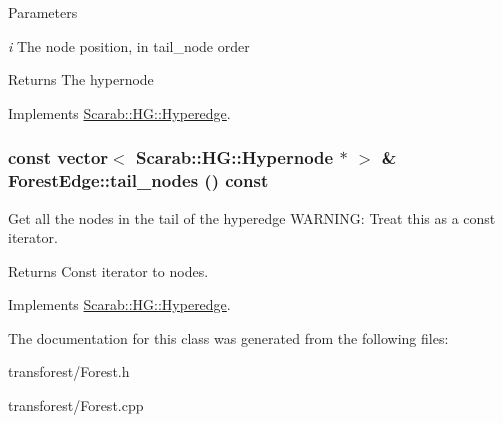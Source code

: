 \begin{DoxyParams}{Parameters}
\item[{\em i}]The node position, in tail\_\-node order\end{DoxyParams}
\begin{DoxyReturn}{Returns}
The hypernode 
\end{DoxyReturn}


Implements \hyperlink{classScarab_1_1HG_1_1Hyperedge_a3c5365ccb2a36982ddde36445e39e771}{Scarab::HG::Hyperedge}.

\hypertarget{classForestEdge_acb7544b472df09ef760c88afddeab5de}{
\subsubsection[{tail\_\-nodes}]{\setlength{\rightskip}{0pt plus 5cm}const vector$<$ {\bf Scarab::HG::Hypernode} $\ast$ $>$ \& ForestEdge::tail\_\-nodes () const}}
\label{classForestEdge_acb7544b472df09ef760c88afddeab5de}
Get all the nodes in the tail of the hyperedge WARNING: Treat this as a const iterator. \begin{DoxyReturn}{Returns}
Const iterator to nodes. 
\end{DoxyReturn}


Implements \hyperlink{classScarab_1_1HG_1_1Hyperedge_abac6d27691186608aa12949de6e1c283}{Scarab::HG::Hyperedge}.



The documentation for this class was generated from the following files:\begin{DoxyCompactItemize}
\item 
transforest/Forest.h\item 
transforest/Forest.cpp\end{DoxyCompactItemize}

